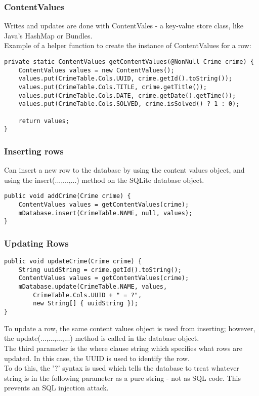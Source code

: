 \documentclass[]{article}
\begin{document}
\subsubsection{ContentValues}
Writes and updates are done with ContentVales - a key-value store class, like Java's HashMap or Bundles.
\\
Example of a helper function to create the instance of ContentValues for a row:
\begin{lstlisting}
private static ContentValues getContentValues(@NonNull Crime crime) {
	ContentValues values = new ContentValues();
	values.put(CrimeTable.Cols.UUID, crime.getId().toString());
	values.put(CrimeTable.Cols.TITLE, crime.getTitle());
	values.put(CrimeTable.Cols.DATE, crime.getDate().getTime());
	values.put(CrimeTable.Cols.SOLVED, crime.isSolved() ? 1 : 0);

	return values;
}
\end{lstlisting}

\subsubsection{Inserting rows}
Can insert a new row to the database by using the content values object, and using the insert(...,...,...) method on the SQLite database object.

\begin{lstlisting}
public void addCrime(Crime crime) {
	ContentValues values = getContentValues(crime);
	mDatabase.insert(CrimeTable.NAME, null, values);
}
\end{lstlisting}

\subsubsection{Updating Rows}

\begin{lstlisting}
public void updateCrime(Crime crime) {
	String uuidString = crime.getId().toString();
	ContentValues values = getContentValues(crime);
	mDatabase.update(CrimeTable.NAME, values,
		CrimeTable.Cols.UUID + " = ?",
		new String[] { uuidString });
}
\end{lstlisting}
To update a row, the same content values object is used from inserting; however, the update(...,...,...,...) method is called in the database object.
\\
The third parameter is the where clause string which specifies what rows are updated.  In this case, the UUID is used to identify the row.
\\
To do this, the '?' syntax is used which tells the database to treat whatever string is in the following parameter as a pure string - not as SQL code.  This prevents an SQL injection attack.
\end{document}

